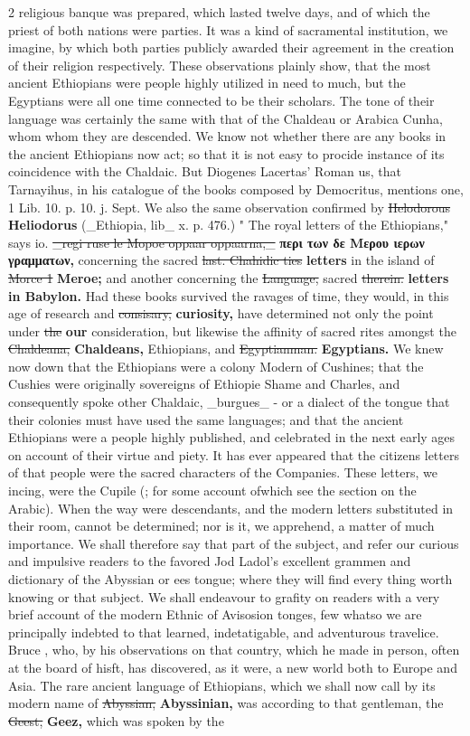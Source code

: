 \documentclass[10pt]{article}
\begin{document}
\begin{multicols}{2}
religious banque was prepared, which lasted twelve days, and of which the priest of both nations were parties. It was a kind of sacramental institution, we imagine, by which both parties publicly awarded their agreement in the creation of their religion respectively. These observations plainly show, that the most ancient Ethiopians were people highly utilized in need to much, but the Egyptians were all one time connected to be their scholars. The tone of their language was certainly the same with that of the Chaldeau or Arabica Cunha, whom whom they are descended. We know not whether there are any books in the ancient Ethiopians now act; so that it is not easy to procide instance of its coincidence with the Chaldaic. But Diogenes Lacertas’ Roman us, that Tarnayihus, in his catalogue of the books composed by Democritus, mentions one, 1 Lib. 10. p. 10. j. Sept. We also the same observation confirmed by \sout{Helodorous} \textbf{Heliodorus} (\_Ethiopia, lib\_ x. p. 476.) " The royal letters of the Ethiopians," says io. \sout{\_regi ruse le Mopoe oppaar oppaarna,\_} \textbf{περι των δε Μερου ιερων γραμματων,} concerning the sacred \sout{last. Chahidic ties} \textbf{letters} in the island of \sout{Morce 1} \textbf{Meroe;} and another concerning the \sout{Language,} sacred \sout{therein.} \textbf{letters in Babylon.} Had these books survived the ravages of time, they would, in this age of research and \sout{consisary,} \textbf{curiosity,} have determined not only the point under \sout{the} \textbf{our} consideration, but likewise the affinity of sacred rites amongst the \sout{Chaldeana,} \textbf{Chaldeans,} Ethiopians, and \sout{Egyptianman.} \textbf{Egyptians.} We knew now down that the Ethiopians were a colony Modern of Cushines; that the Cushies were originally sovereigns of Ethiopie Shame and Charles, and consequently spoke other Chaldaic, \_burgues\_ - or a dialect of the tongue that their colonies must have used the same languages; and that the ancient Ethiopians were a people highly published, and celebrated in the next early ages on account of their virtue and piety. It has ever appeared that the citizens letters of that people were the sacred characters of the Companies. These letters, we incing, were the Cupile (; for some account ofwhich see the section on the Arabic). When the way were descendants, and the modern letters substituted in their room, cannot be determined; nor is it, we apprehend, a matter of much importance. We shall therefore say that part of the subject, and refer our curious and impulsive readers to the favored Jod Ladol's excellent grammen and dictionary of the Abyssian or ees tongue; where they will find every thing worth knowing or that subject. We shall endeavour to grafity on readers with a very brief account of the modern Ethnic of Avisosion tonges, few whatso we are principally indebted to that learned, indetatigable, and adventurous travelice. Bruce , who, by his observations on that country, which he made in person, often at the board of hisft, has discovered, as it were, a new world both to Europe and Asia. The rare ancient language of Ethiopians, which we shall now call by its modern name of \sout{Abyssian,} \textbf{Abyssinian,} was according to that gentleman, the \sout{Geest,} \textbf{Geez,} which was spoken by the 
\end{multicols}
\end{document}
